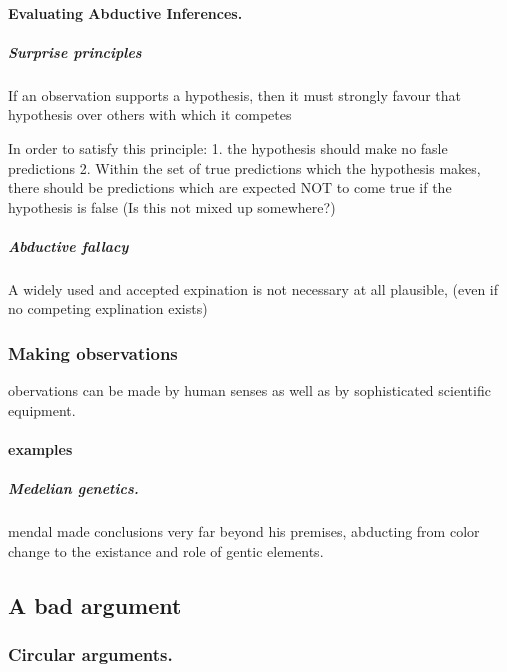 \documentclass[]{article}
\let\oldparagraph\paragraph
\renewcommand{\paragraph}[1]{\oldparagraph{#1}\mbox{}}
\let\oldsubparagraph\subparagraph
\renewcommand{\subparagraph}[1]{\oldsubparagraph{#1}\mbox{}}
\begin{document}
\hypertarget{evaluating-abductive-inferences.}{%
\paragraph{Evaluating Abductive
Inferences.}\label{evaluating-abductive-inferences.}}

\hypertarget{surprise-principles}{%
\subparagraph{Surprise principles}\label{surprise-principles}}

If an observation supports a hypothesis, then it must strongly favour
that hypothesis over others with which it competes

In order to satisfy this principle: 1. the hypothesis should make no
fasle predictions 2. Within the set of true predictions which the
hypothesis makes, there should be predictions which are expected NOT to
come true if the hypothesis is false (Is this not mixed up somewhere?)

\hypertarget{abductive-fallacy}{%
\subparagraph{Abductive fallacy}\label{abductive-fallacy}}

A widely used and accepted expination is not necessary at all plausible,
(even if no competing explination exists)

\hypertarget{making-observations}{%
\subsubsection{Making observations}\label{making-observations}}

obervations can be made by human senses as well as by sophisticated
scientific equipment.

\hypertarget{examples-2}{%
\paragraph{examples}\label{examples-2}}

\hypertarget{medelian-genetics.}{%
\subparagraph{Medelian genetics.}\label{medelian-genetics.}}

mendal made conclusions very far beyond his premises, abducting from
color change to the existance and role of gentic elements.

\hypertarget{a-bad-argument}{%
\subsection{A bad argument}\label{a-bad-argument}}

\hypertarget{circular-arguments.}{%
\subsubsection{Circular arguments.}\label{circular-arguments.}}
\end{document}
